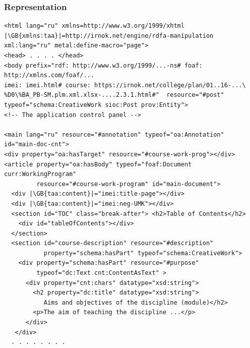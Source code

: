 \documentclass[10pt]{beamer}
\newcommand{\GB}[1]{\colorbox{green}{#1}}
\newcommand{\btprgsize}{\fontsize{7}{7}\selectfont}
\begin{document}
\begin{frame}
  \frametitle{Representation}

\begin{adjustwidth}{-1.5em}{-1.5em}
\begin{verbatim}
<html lang="ru" xmlns=http://www.w3.org/1999/xhtml
|\GB{xmlns:taa}|=http://irnok.net/engine/rdfa-manipulation
xml:lang="ru" metal:define-macro="page">
<head> . . . . </head>
<body prefix="rdf: http://www.w3.org/1999/...-ns# foaf: http://xmlns.com/foaf/...
imei: imei.html# course: https://irnok.net/college/plan/01..16-...\
%D0\%BA_PB-SM.plm.xml.xlsx-....2.3.1.html#"  resource="#post"
typeof="schema:CreativeWork sioc:Post prov:Entity">
<!-- The application control panel -->

<main lang="ru" resource="#annotation" typeof="oa:Annotation" id="main-doc-cnt">
<div property="oa:hasTarget" resource="#course-work-prog"></div>
<article property="oa:hasBody" typeof="foaf:Document curr:WorkingProgram"
         resource="#course-work-program" id="main-document">
  <div |\GB{taa:content}|="imei:title-page"></div>
  <div |\GB{taa:content}|="imei:neg-UMK"></div>
  <section id="TOC" class="break-after"> <h2>Table of Contents</h2>
    <div id="tableOfContents"></div>
  </section>
  <section id="course-description" resource="#description"
           property="schema:hasPart" typeof="schema:CreativeWork">
    <div property="schema:hasPart" resource="#purpose"
         typeof="dc:Text cnt:ContentAsText" >
      <div property="cnt:chars" datatype="xsd:string">
        <h2 property="dc:title" datatype="xsd:string">
           Aims and objectives of the discipline (module)</h2>
        <p>The aim of teaching the discipline ...</p>
      </div>
   </div>
  . . . . . . . .
\end{verbatim}
\end{adjustwidth}
\end{frame}
\end{document}
